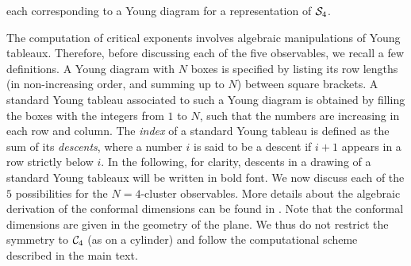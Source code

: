 \documentclass[aps,prl,twocolumn,showpacs,superscriptaddress,groupedaddress]{revtex4}  %
\begin{document}
each corresponding to a Young diagram for a representation of ${\cal S}_4$.

The computation of critical exponents involves algebraic manipulations of Young tableaux. Therefore, before discussing each of the five observables, we recall a few definitions. A Young diagram with $N$ boxes is specified by listing its row lengths (in non-increasing order, and summing up to $N$) between square brackets. A standard Young tableau associated to such a Young diagram is obtained by filling the boxes with the integers from $1$ to $N$, such that the numbers are increasing in each row and column. The {\em index} of a standard Young tableau is defined as the sum of its {\em descents}, where a number $i$ is said to be a descent if $i+1$ appears in a row strictly below $i$. In the following, for clarity, descents in a drawing of a standard Young tableaux will be written in bold font. We now discuss each of the $5$ possibilities for the $N=4$-cluster observables. More details about the algebraic derivation of the conformal dimensions can be found in \cite{CJV}. Note that the conformal dimensions are given in the geometry of the plane. We thus do not restrict the symmetry to ${\cal C}_4$ (as on a cylinder) and follow the computational scheme described in the main text.
\end{document}
